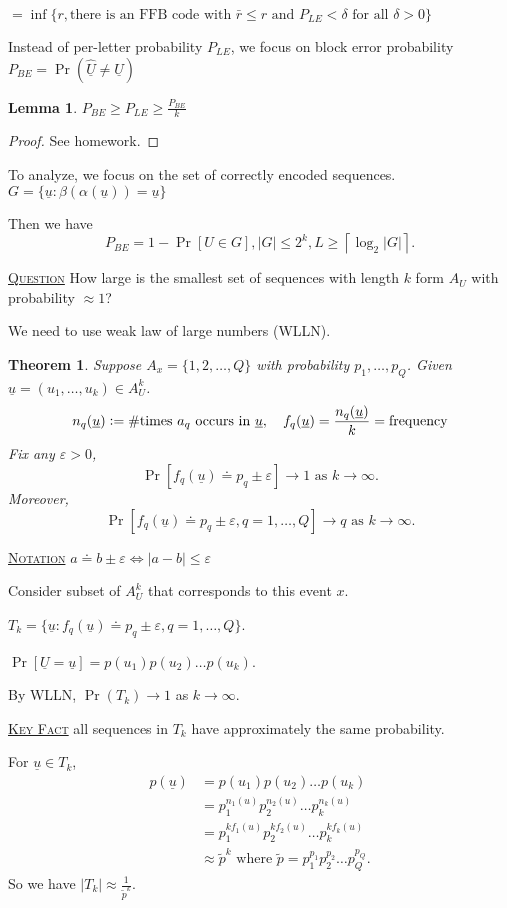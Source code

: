 \documentclass{report}
\newcommand{\ceil}[1]{\left\lceil #1 \right\rceil}
\newcommand{\defeq}{\vcentcolon=}
\newcommand{\fancyem}[1]{\underline{\textsc{#1}}}
\newtheorem{theorem}{Theorem}[section]
\newtheorem{lemma}{Lemma}[section]
\theoremstyle{definition}
\theoremstyle{remark}
\numberwithin{equation}{section}
\begin{document}
$ = \inf \{r, \text{there is an FFB code with $\bar{r} \leq r$ and $P_{LE} < \delta$ for all $\delta > 0$}\}$

Instead of per-letter probability $P_{LE}$, we focus on block error probability $P_{BE} = \Pr(\underline{\hat{U}} \neq \underline{U})$

\begin{lemma}
  $P_{BE} \geq P_{LE} \geq \frac{P_{BE}}{k}$
\end{lemma}
\begin{proof}
  See homework.
\end{proof}

To analyze, we focus on the set of correctly encoded sequences. $G = \{\underline{u}: \beta(\alpha(\underline{u})) = \underline{u}\}$

Then we have \[P_{BE} = 1 - \Pr[U \in G], |G| \leq 2^k, L \geq \ceil{\log_2|G|}.\]

\fancyem{Question} How large is the smallest set of sequences with length $k$ form $A_U$ with probability $\approx 1$? 

We need to use weak law of large numbers (WLLN).

\begin{theorem}
  Suppose $A_x = \{1, 2, \ldots, Q\}$ with probability $p_1, \ldots, p_Q$. Given $\underline{u} = (u_1, \ldots, u_k) \in A^k_U$.
  \[
    n_q(\underline{u}) \defeq \# \text{times $a_q$ occurs in $\underline{u}$}, \quad f_q(\underline{u}) = \frac{n_q(\underline{u})}{k} = \text{frequency}
  \]
  Fix any $\varepsilon > 0$, \[
    \Pr[f_q(\underline{u}) \doteq p_q \pm \varepsilon] \to 1 \text{ as } k \to \infty.
  \] Moreover,
  \[
    \Pr[f_q(\underline{u}) \doteq p_q \pm \varepsilon, q = 1, \ldots, Q] \to q \text{ as } k \to \infty.  
  \]
\end{theorem}
\fancyem{Notation} $a \doteq b \pm \varepsilon \iff |a - b| \leq \varepsilon$

Consider subset of $A^k_U$ that corresponds to this event $x$.

$T_k = \{\underline{u}: f_q(\underline{u}) \doteq p_q \pm \varepsilon, q = 1, \ldots, Q\}$.

$\Pr[\underline{U} = \underline{u}] = p(u_1)p(u_2)\ldots p(u_k)$.

By WLLN, $\Pr(T_k) \to 1$ as $k \to \infty$.

\fancyem{Key Fact} all sequences in $T_k$ have approximately the same probability.

For $\underline{u} \in T_k$,
\begin{align*}
  p(\underline{u}) & = p(u_1)p(u_2)\ldots p(u_k) \\
  & = p_1^{n_1(u)}p_2^{n_2(u)}\ldots p_k^{n_k(u)} \\
  & = p_1^{kf_1(u)}p_2^{kf_2(u)}\ldots p_k^{kf_k(u)} \\
  & \approx \tilde{p}^k \text{ where } \tilde{p} = p_1^{p_1}p_2^{p_2} \ldots p_Q^{p_Q}.
\end{align*}
So we have $|T_k| \approx \frac{1}{\tilde{p}^k}$.
\end{document}

